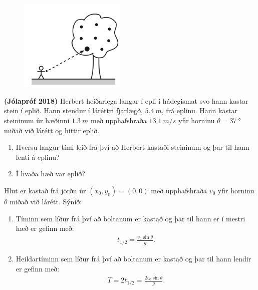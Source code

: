 \ifdefined \wholebook \else\documentclass[oneside]{book}\usepackage{EdlBook}\graphicspath{{figures/}}
\begin{document}
\begin{enumerate}[label = \textbf{Dæmi \thechapter.\arabic*.}]
\begin{minipage}{\linewidth}
\end{minipage}


\begin{minipage}{\linewidth}
\begin{figure}
\vspace{-1.5cm}
\includegraphics[width=2in]{images/epli.png}
\end{figure}

\item \textbf{(Jólapróf 2018)} Herbert heiðarlega langar í epli í hádegismat svo hann kastar stein í eplið. Hann stendur í láréttri fjarlægð, $\SI{5,4}{m}$, frá eplinu. Hann kastar steininum úr hæðinni $\SI{1,3}{m}$ með upphafshraða $\SI{13,1}{m/s}$  yfir horninu $\theta = \SI{37}{\degree}$ miðað við lárétt og hittir eplið.

\begin{enumerate}[label = \textbf{(\alph*)}]
\item Hversu langur tími leið frá því að Herbert kastaði steininum og þar til hann lenti á eplinu?
\item Í hvaða hæð var eplið?
\end{enumerate}

\end{minipage}

\item Hlut er kastað frá jörðu úr $(x_0, y_0) = (0,0)$ með upphafshraða $v_0$ yfir horninu $\theta$ miðað við lárétt. Sýnið:
\begin{enumerate}[label = \textbf{(\alph*)}]
    \item Tíminn sem líður frá því að boltanum er kastað og þar til hann er í mestri hæð er gefinn með:
    \begin{align*}
        t_{1/2} = \frac{v_0 \sin\theta}{g}.
    \end{align*}
    \item Heildartíminn sem líður frá því að boltanum er kastað og þar til hann lendir er gefinn með:
    \begin{align*}
        T = 2t_{1/2} = \frac{2v_0 \sin\theta}{g}.
    \end{align*}
    

\end{enumerate}
\end{enumerate}
\end{document}
